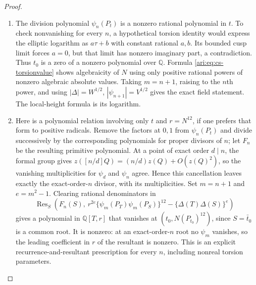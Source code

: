 \begin{proof}
\begin{enumerate}[label=\arabic*.,leftmargin=*]
\item The division polynomial $\psi_n(P_t)$ is a nonzero rational
polynomial in $t$. To check nonvanishing for every $n$, a hypothetical
torsion identity would express the elliptic logarithm as
$a\tau+b$ with constant rational $a,b$. Its bounded cusp limit
forces $a=0$, but that limit has nonzero imaginary part, a
contradiction. Thus $t_0$ is a zero of a nonzero polynomial over
$\mathbb Q$. Formula \eqref{ari:eq:cs-torsionvalue} shows algebraicity
of $N$ using only positive rational powers of nonzero algebraic
absolute values. Taking $m=n+1$, raising to the $n$th power, and
using $|\Delta|=W^{1/2}$, $|\psi_{n+1}|=V^{1/2}$ gives the exact
field statement. The local-height formula is its logarithm.

\item Here is a polynomial relation involving only $t$ and $r=N^{12}$,
if one prefers that form to positive radicals. Remove the factors
at $0,1$ from $\psi_n(P_t)$ and divide successively by the
corresponding polynomials for proper divisors of $n$; let $F_n$ be
the resulting primitive polynomial. At a point of exact order
$d\mid n$, the formal group gives
$z([n/d]Q)=(n/d)z(Q)+O(z(Q)^2)$, so the vanishing multiplicities for
$\psi_d$ and $\psi_n$ agree. Hence this cancellation leaves exactly
the exact-order-$n$ divisor, with its multiplicities. Set
$m=n+1$ and $e=m^2-1$. Clearing rational denominators in
\[
 \operatorname{Res}_S\left(
 F_n(S),\
 r^{2e}\{\psi_m(P_T)\psi_m(P_S)\}^{12}
              -\{\Delta(T)\Delta(S)\}^{e}\right)
\]
gives a polynomial in $\mathbb Q[T,r]$ that vanishes at
$(t_0,N(P_{t_0})^{12})$, since $S=\bar t_0$ is a common root.
It is nonzero: at an exact-order-$n$ root no $\psi_m$ vanishes,
so the leading coefficient in $r$ of the resultant is nonzero.
This is an explicit recurrence-and-resultant prescription for
every $n$, including nonreal torsion parameters.
\end{enumerate}
\end{proof}

